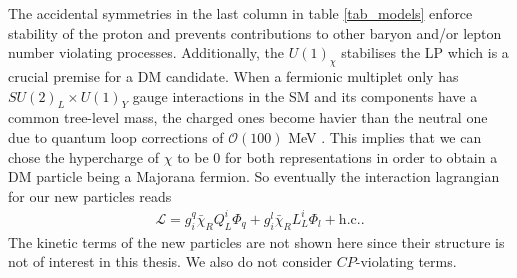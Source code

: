 The accidental symmetries in the last column in table \ref{tab_models}
enforce stability of the proton and prevents contributions to other baryon and/or lepton number violating
processes. Additionally, the $U(1)_\chi$ stabilises the LP which is a crucial premise for a DM candidate. 
When a fermionic multiplet only has $SU(2)_L\times U(1)_Y$ gauge interactions in the SM and its components have a common tree-level mass, the charged 
ones become havier than the neutral one due to quantum loop corrections of $\mathcal{O}(100)$ MeV \cite{Hisano}\cite{minMatter}. This implies that 
we can chose the hypercharge of $\chi$ to be 0 for both representations in order to obtain a DM particle being a Majorana fermion. So eventually 
the interaction lagrangian for our new particles reads
\begin{align}
 \mathcal{L} = g_i^q \bar \chi_R Q_L^i \Phi_q + g_i^l \bar \chi_R L_L^i \Phi_l + \text{h.c.}.
 \label{eq_modelLagrangian}
\end{align}
The kinetic terms of the new particles are not shown here since their structure is not of interest in this thesis. We also do not consider $CP$-violating
terms.